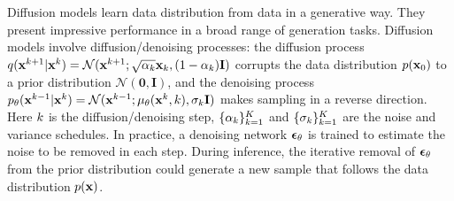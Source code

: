 Diffusion models \citep{ho2020denoising} learn data distribution from data in a generative way. They present impressive performance in a broad range of generation tasks. Diffusion models involve diffusion/denoising processes: the diffusion process $q(\mathbf{x}^{k+1}|\mathbf{x}^k)=\mathcal{N}(\mathbf{x}^{k+1};\sqrt{\alpha_k}\mathbf{x}_k,(1-\alpha_k)\mathbf{I})$
corrupts the data distribution $p(\mathbf{x}_0)$ to a prior distribution $\mathcal{N}(\mathbf{0}, \mathbf{I})$, and the denoising process $p_{\theta}(\mathbf{x}^{k-1}|\mathbf{x}^k)=\mathcal{N}(\mathbf{x}^{k-1};\mu_\theta(\mathbf{x}^k,k),\sigma_k \mathbf{I})$ makes sampling in a reverse direction. Here $k$ is the diffusion/denoising step, $\{\alpha_k\}_{k=1}^K$ and $\{\sigma_k\}_{k=1}^K$ are the noise and variance schedules. In practice, a denoising network $\bm{\epsilon}_{\theta}$ is trained to estimate the noise to be removed in each step. 
During inference, the iterative removal of $\bm{\epsilon}_{\theta}$ from the prior distribution could generate a new sample that follows the data distribution $p(\mathbf{x})$. 

